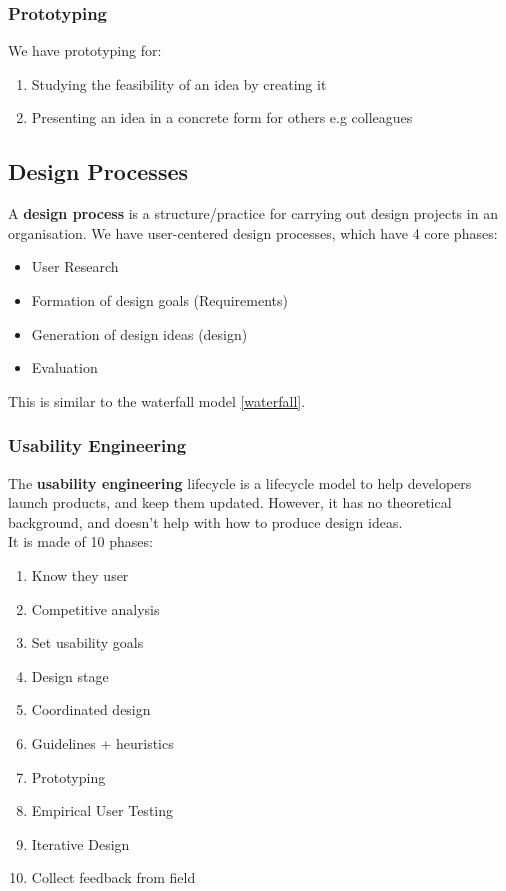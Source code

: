 \documentclass{article}
\begin{document}
\subsubsection*{Prototyping}
We have prototyping for:
\begin{enumerate}
    \item Studying the feasibility of an idea by creating it
    \item Presenting an idea in a concrete form for others e.g colleagues
\end{enumerate}
\subsection{Design Processes}
A \textbf{design process} is a structure/practice for carrying out design projects in an organisation. We have user-centered design processes, which have 4 core phases:
\begin{itemize}
    \item User Research
    \item Formation of design goals (Requirements)
    \item Generation of design ideas (design)
    \item Evaluation
\end{itemize}
This is similar to the waterfall model \eqref{waterfall}.
\subsubsection*{Usability Engineering}
The \textbf{usability engineering} lifecycle is a lifecycle model to help developers launch products, and keep them updated. However, it has no theoretical background, and doesn't help with how to produce design ideas. \\
It is made of 10 phases:
\begin{multicols}{2}
\begin{enumerate}
    \item Know they user
    \item Competitive analysis
    \item Set usability goals
    \item Design stage
    \item Coordinated design
    \item Guidelines + heuristics
    \item Prototyping
    \item Empirical User Testing
    \item Iterative Design
    \item Collect feedback from field
\end{enumerate}
\end{multicols}
\end{document}
